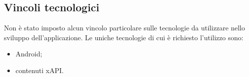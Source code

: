 \documentclass[../Tesi.tex]{subfiles}
\begin{document}
	\subsection{Vincoli tecnologici}
		Non è stato imposto alcun vincolo particolare sulle tecnologie da utilizzare nello sviluppo dell'applicazione. Le uniche tecnologie di cui è richiesto l'utilizzo sono:
		\begin{itemize}
			\item Android;
			\item contenuti xAPI.
		\end{itemize}
\end{document}
